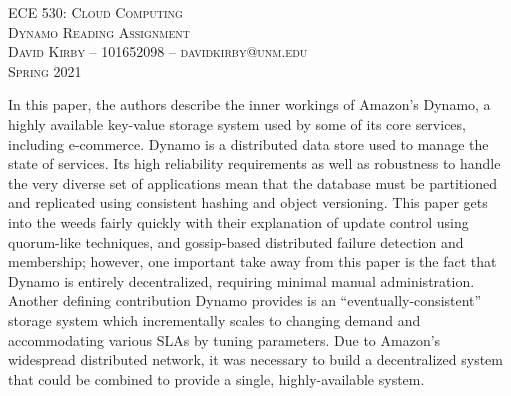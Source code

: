 \documentclass{article}
\begin{document}
\setmainfont{SF Pro Text}
\setsansfont{SF Pro Text}
\setmonofont{SF Mono}
\renewcommand{\familydefault}{\sfdefault}

\thispagestyle{empty}
\begin{center}
\textsc{\Huge{ECE 530: Cloud Computing}}\\[2em]
\textsc{\LARGE Dynamo Reading Assignment}\\[2em]
\textsc{\Large David Kirby -- 101652098 -- davidkirby@unm.edu}\\[2em]
\textsc{\Large Spring 2021}
\end{center}

\hypersetup{
    linkcolor=CrispBlue,
    urlcolor=CrispBlue,
    breaklinks=true
}

In this paper, the authors describe the inner workings of Amazon's Dynamo, a highly available key-value storage system used by some of its core services, including e-commerce. Dynamo is a distributed data store used to manage the state of services. Its high reliability requirements as well as robustness to handle the very diverse set of applications mean that the database must be partitioned and replicated using consistent hashing and object versioning. This paper gets into the weeds fairly quickly with their explanation of update control using quorum-like techniques, and gossip-based distributed failure detection and membership; however, one important take away from this paper is the fact that Dynamo is entirely decentralized, requiring minimal manual administration. Another defining contribution Dynamo provides is an ``eventually-consistent'' storage system which incrementally scales to changing demand and accommodating various SLAs by tuning parameters. Due to Amazon's widespread distributed network, it was necessary to build a decentralized system that could be combined to provide a single, highly-available system.
\end{document}

